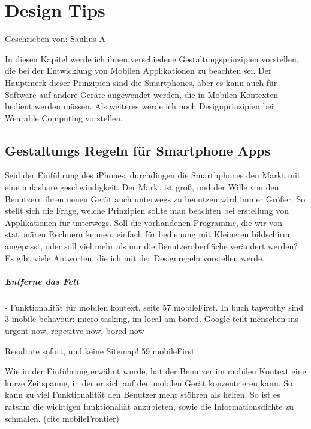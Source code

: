 
\section{Design Tips}

Geschrieben von: Saulius A

In diesen Kapitel werde ich ihnen verschiedene Gestaltungsprinzipien vorstellen, die bei der Entwicklung von Mobilen Applikationen zu beachten sei. Der Hauptmerk dieser Prinzipien sind die Smartphones, aber es kann auch für Software auf andere Geräte angewendet werden, die in Mobilen Kontexten bedient werden müssen. Als weiteres werde ich noch Designprinzipien bei Wearable Computing vorstellen. 

\subsection{Gestaltungs Regeln für Smartphone Apps} %
\label{sub:design_f_r_mobile_ger_te}

Seid der Einführung des iPhones, durchdingen die Smarthphones den Markt mit eine unfasbare geschwindigkeit. Der Markt ist groß, und der Wille von den Benutzern ihren neuen Gerät auch unterwegs zu benutzen wird immer Größer. So stellt sich die Frage, welche Prinzipien sollte man beachten bei erstellung von Applikationen für unterwegs. Soll die vorhandenen Programme, die wir von stationären Rechnern kennen, einfach für bedienung mit Kleineren bildschirm angepasst, oder soll viel mehr als nur die Benutzeroberfläche verändert werden? Es gibt viele Antworten, die ich mit der Designregeln vorstellen werde.

\subparagraph{Entferne das Fett} %
\label{subp:entferne_das_fett}

- Funktionalität für mobilen kontext, seite 57 mobileFirst. In buch tapwothy sind 3 mobile behavour: micro-tasking, im local am bored. Google teilt menschen ins urgent now, repetitve now, bored now

Resultate sofort, und keine Sitemap! 59 mobileFirst

Wie in der Einführung erwähnt wurde, hat der Benutzer im mobilen Kontext eine kurze Zeitspanne, in der er sich auf den mobilen Gerät konzentrieren kann. So kann zu viel Funktionalität den Benutzer mehr stöhren als helfen. So ist es ratsam die wichtigen funktionaliät anzubieten, sowie die Informationsdichte zu schmalen. (cite mobileFrontier)


